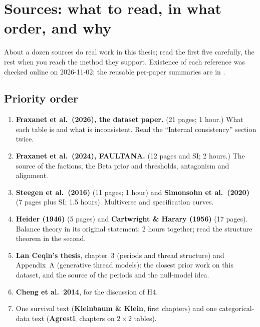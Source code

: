 \chapter{Sources: what to read, in what order, and why}\label{ch:sources}

\begin{idea}
About a dozen sources do real work in this thesis; read the first five carefully, the rest when you reach the method they support. Existence of each reference was checked online on 2026-11-02; the reusable per-paper summaries are in .
\end{idea}

\section{Priority order}
\begin{enumerate}
  \item \textbf{Fraxanet et al.\ (2026), the dataset paper.} (21 pages; 1 hour.) What each table is and what is inconsistent. Read the ``Internal consistency'' section twice.
  \item \textbf{Fraxanet et al.\ (2024), FAULTANA.} (12 pages and SI; 2 hours.) The source of the factions, the Beta prior and thresholds, antagonism and alignment.
  \item \textbf{Steegen et al.\ (2016)} (11 pages; 1 hour) and \textbf{Simonsohn et al.\ (2020)} (7 pages plus SI; 1.5 hours). Multiverse and specification curves.
  \item \textbf{Heider (1946)} (5 pages) and \textbf{Cartwright \& Harary (1956)} (17 pages). Balance theory in its original statement; 2 hours together; read the structure theorem in the second.
  \item \textbf{Lan Ceqin's thesis}, chapter~3 (periods and thread structure) and Appendix~A (generative thread models): the closest prior work on this dataset, and the source of the periods and the null-model idea.
  \item \textbf{Cheng et al.\ 2014}, for the discussion of H4.
  \item One survival text (\textbf{Kleinbaum \& Klein}, first chapters) and one categorical-data text (\textbf{Agresti}, chapters on $2\times2$ tables).
\end{enumerate}

